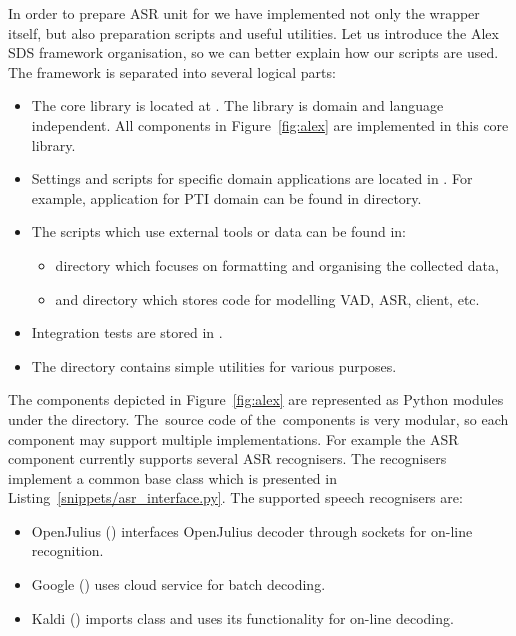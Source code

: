In order to prepare \ac{ASR} unit for  we have implemented not only the wrapper itself, but also preparation scripts and useful utilities. 
Let us introduce the Alex \ac{SDS} framework organisation, so we can better explain how our scripts are used.
The framework is separated into several logical parts:
\begin{itemize}
    \item The core library is located at . The library is domain and language independent. All components in Figure~\ref{fig:alex} are implemented in this core library.
    \item Settings and scripts for specific domain applications are located in .
        For example, application for \ac{PTI} domain can be found in  directory.
    \item The scripts which use external tools or data can be found in:
        \begin{itemize}
            \item {} directory which focuses on formatting and organising the collected data,
            \item and \term {} directory which stores code for modelling \ac{VAD}, \ac{ASR},  client, etc.
        \end{itemize}
    \item Integration tests are stored in .
    \item The  directory contains simple utilities for various purposes.
\end{itemize}

The components depicted in Figure~\ref{fig:alex} are represented as Python modules under the  directory.
The~source code of the~components is very modular, so each component may support multiple implementations.
For example the \ac{ASR} component currently supports several \ac{ASR} recognisers.
The recognisers implement a common base class  which is presented in Listing~\ref{snippets/asr_interface.py}.
The supported speech recognisers are:
\begin{itemize}
    \item OpenJulius () interfaces OpenJulius decoder through sockets for on-line recognition.
    \item Google () uses cloud service for batch decoding.
    \item Kaldi () imports  class and uses its functionality for on-line decoding.
\end{itemize}

